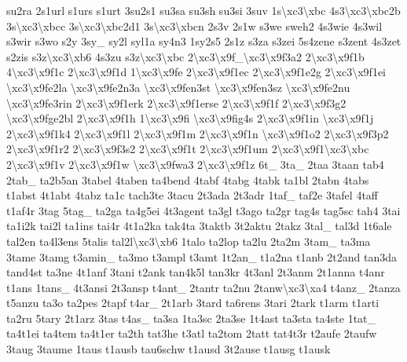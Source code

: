 \begin{DoxyCompactItemize}
su2ra 2s1url s1urs s1urt 3su2s1 su3sa su3sh su3si 3suv 1s\textbackslash{}xc3\textbackslash{}xbc 4s3\textbackslash{}xc3\textbackslash{}xbc2b 3s\textbackslash{}xc3\textbackslash{}xbcc 3s\textbackslash{}xc3\textbackslash{}xbc2d1 3s\textbackslash{}xc3\textbackslash{}xbcn 2s3v 2s1w s3we sweh2 4s3wie 4s3wil s3wir s3wo s2y 3sy\-\_\- sy2l syl1a sy4n3 1sy2s5 2s1z s3za s3zei 5s4zene s3zent 4s3zet s2zis s3z\textbackslash{}xc3\textbackslash{}xb6 4s3zu s3z\textbackslash{}xc3\textbackslash{}xbc 2\textbackslash{}xc3\textbackslash{}x9f\-\_\textbackslash{}xc3\textbackslash{}x9f3a2 2\textbackslash{}xc3\textbackslash{}x9f1b 4\textbackslash{}xc3\textbackslash{}x9f1c 2\textbackslash{}xc3\textbackslash{}x9f1d 1\textbackslash{}xc3\textbackslash{}x9fe 2\textbackslash{}xc3\textbackslash{}x9f1ec 2\textbackslash{}xc3\textbackslash{}x9f1e2g 2\textbackslash{}xc3\textbackslash{}x9f1ei \textbackslash{}xc3\textbackslash{}x9fe2la \textbackslash{}xc3\textbackslash{}x9fe2n3a \textbackslash{}xc3\textbackslash{}x9fen3st \textbackslash{}xc3\textbackslash{}x9fen3sz \textbackslash{}xc3\textbackslash{}x9fe2nu \textbackslash{}xc3\textbackslash{}x9fe3rin 2\textbackslash{}xc3\textbackslash{}x9f1erk 2\textbackslash{}xc3\textbackslash{}x9f1erse 2\textbackslash{}xc3\textbackslash{}x9f1f 2\textbackslash{}xc3\textbackslash{}x9f3g2 \textbackslash{}xc3\textbackslash{}x9fge2bl 2\textbackslash{}xc3\textbackslash{}x9f1h 1\textbackslash{}xc3\textbackslash{}x9fi \textbackslash{}xc3\textbackslash{}x9fig4s 2\textbackslash{}xc3\textbackslash{}x9f1in \textbackslash{}xc3\textbackslash{}x9f1j 2\textbackslash{}xc3\textbackslash{}x9f1k4 2\textbackslash{}xc3\textbackslash{}x9f1l 2\textbackslash{}xc3\textbackslash{}x9f1m 2\textbackslash{}xc3\textbackslash{}x9f1n \textbackslash{}xc3\textbackslash{}x9f1o2 2\textbackslash{}xc3\textbackslash{}x9f3p2 2\textbackslash{}xc3\textbackslash{}x9f1r2 2\textbackslash{}xc3\textbackslash{}x9f3s2 2\textbackslash{}xc3\textbackslash{}x9f1t 2\textbackslash{}xc3\textbackslash{}x9f1um 2\textbackslash{}xc3\textbackslash{}x9f1\textbackslash{}xc3\textbackslash{}xbc 2\textbackslash{}xc3\textbackslash{}x9f1v 2\textbackslash{}xc3\textbackslash{}x9f1w \textbackslash{}xc3\textbackslash{}x9fwa3 2\textbackslash{}xc3\textbackslash{}x9f1z 6t\-\_\- 3ta\-\_\- 2taa 3taan tab4 2tab\-\_\- ta2b5an 3tabel 4taben ta4bend 4tabf 4tabg 4tabk ta1bl 2tabn 4tabs t1abst 4t1abt 4tabz ta1c tach3te 3tacu 2t3ada 2t3adr 1taf\-\_\- taf2e 3tafel 4taff t1af4r 3tag 5tag\-\_\- ta2ga ta4g5ei 4t3agent ta3gl t3ago ta2gr tag4s tag5sc tah4 3tai ta1i2k tai2l ta1ins tai4r 4t1a2ka tak4ta 3taktb 3t2aktu 2takz 3tal\-\_\- tal3d 1t6ale tal2en ta4l3ens 5talis tal2l\textbackslash{}xc3\textbackslash{}xb6 1talo ta2lop ta2lu 2ta2m 3tam\-\_\- ta3ma 3tame 3tamg t3amin\-\_\- ta3mo t3ampl t3amt 1t2an\-\_\- t1a2na t1anb 2t2and tan3da tand4st ta3ne 4t1anf 3tani t2ank tan4k5l tan3kr 4t3anl 2t3anm 2t1anna t4anr t1ans 1tans\-\_\- 4t3ansi 2t3ansp t4ant\-\_\- 2tantr ta2nu 2tanw\textbackslash{}xc3\textbackslash{}xa4 t4anz\-\_\- 2tanza t5anzu ta3o ta2pes 2tapf t4ar\-\_\- 2t1arb 3tard ta6rens 3tari 2tark t1arm t1arti ta2ru 5tary 2t1arz 3tas t4as\-\_\- ta3sa 1ta3sc 2ta3se 1t4ast ta3sta ta4ste 1tat\-\_\- ta4t1ei ta4tem ta4t1er ta2th tat3he t3atl ta2tom 2tatt tat4t3r t2aufe 2taufw 3taug 3taume 1taus t1ausb tau6schw t1ausd 3t2ause t1ausg t1ausk 
\end{DoxyCompactItemize}
